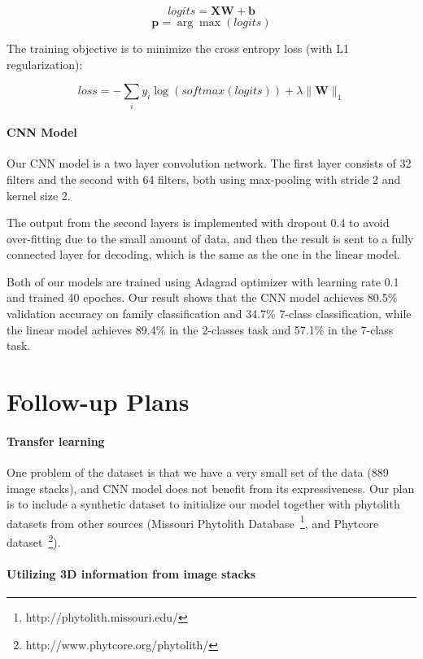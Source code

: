\documentclass{article}
\begin{document}
$$\mathit{logits} = \mathbf{X} \mathbf{W} + \mathbf{b}$$
$$\mathbf{p} = \arg\max(\mathit{logits})$$


The training objective is to minimize the cross entropy loss (with L1 regularization):

$$\mathit{loss} = -\sum\limits_{i} y_i\log(\mathit{softmax}(\mathit{logits})) + \lambda \|\mathbf{W}\|_1$$

\paragraph{CNN Model}

Our CNN model is a two layer convolution network. The first layer consists of 32 filters and the second with 64 filters, both using max-pooling with stride 2 and kernel size 2.

The output from the second layers is implemented with dropout 0.4 to avoid over-fitting due to the small amount of data, and then the result is sent to a fully connected layer for decoding, which is the same as the one in the linear model.

\medskip

Both of our models are trained using Adagrad optimizer with learning rate 0.1 and trained 40 epoches.
Our result shows that the CNN model achieves 80.5\% validation accuracy on family classification and 34.7\% 7-class classification, while the linear model achieves 89.4\% in the 2-classes task and 57.1\% in the 7-class task.


\section{Follow-up Plans}

\paragraph{Transfer learning} One problem of the dataset is that we have a very small set of the data (889 image stacks), and CNN model does not benefit from its expressiveness. Our plan is to include a synthetic dataset to initialize our model together with phytolith datasets from other sources (Missouri Phytolith Database~\footnote{http://phytolith.missouri.edu/}, and Phytcore dataset~\footnote{http://www.phytcore.org/phytolith/}).

\paragraph{Utilizing 3D information from image stacks}
\end{document}

